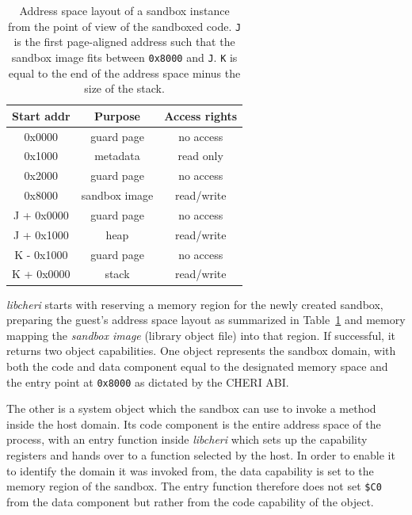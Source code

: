\documentclass[a4paper,12pt,twoside,openright]{report}
\newcommand{\reg}[1]{\texttt{\$#1}}
\newcommand{\tool}[1]{\emph{#1}}
\newcommand{\lib}[1]{\tool{lib#1}}
\begin{document}
\begin{table}
	\centering
	\begin{tabular}{|c|c|c|}
		\hline
		\textbf{Start addr}	& \textbf{Purpose} 				& \textbf{Access rights} 	\\
		\hline
		0x0000				& guard page 					& no access								\\
		0x1000				& metadata 						& read only								\\
		0x2000				& guard page 					& no access								\\
		0x8000				& sandbox image					& read/write 							\\
		J + 0x0000			& guard page 					& no access								\\
		J + 0x1000			& heap							& read/write							\\
		K - 0x1000			& guard page					& no access								\\
		K + 0x0000			& stack							& read/write							\\
		\hline
	\end{tabular}
	\caption{Address space layout of a sandbox instance from the point of view of the sandboxed code. \texttt{J} is the first page-aligned address such that the sandbox image fits between \texttt{0x8000} and \texttt{J}. \texttt{K} is equal to the end of the address space minus the size of the stack.}
	\label{table:addressSpaceLayout}
\end{table}

\lib{cheri} starts with reserving a memory region for the newly created sandbox, preparing the guest's address space layout as summarized in Table~\ref{table:addressSpaceLayout} and memory mapping the \emph{sandbox image} (library object file) into that region. If successful, it returns two object capabilities. One object represents the sandbox domain, with both the code and data component equal to the designated memory space and the entry point at \texttt{0x8000} as dictated by the CHERI ABI. 

\label{sec:SystemObject}
The other is a system object which the sandbox can use to invoke a method inside the host domain. Its code component is the entire address space of the process, with an entry function inside \lib{cheri} which sets up the capability registers and hands over to a function selected by the host. In order to enable it to identify the domain it was invoked from, the data capability is set to the memory region of the sandbox. The entry function therefore does not set \reg{C0} from the data component but rather from the code capability of the object.
\end{document}
